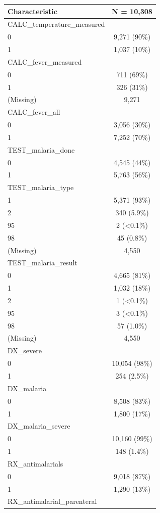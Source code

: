 \documentclass[
  letterpaper,
  DIV=11,
  numbers=noendperiod,
  oneside]{scrreprt}
\begin{document}
\begin{longtable}[]{@{}lc@{}}
\toprule\noalign{}
\textbf{Characteristic} & \textbf{N = 10,308} \\
\midrule\noalign{}
\endhead
\bottomrule\noalign{}
\endlastfoot
CALC\_temperature\_measured & \\
0 & 9,271 (90\%) \\
1 & 1,037 (10\%) \\
CALC\_fever\_measured & \\
0 & 711 (69\%) \\
1 & 326 (31\%) \\
(Missing) & 9,271 \\
CALC\_fever\_all & \\
0 & 3,056 (30\%) \\
1 & 7,252 (70\%) \\
TEST\_malaria\_done & \\
0 & 4,545 (44\%) \\
1 & 5,763 (56\%) \\
TEST\_malaria\_type & \\
1 & 5,371 (93\%) \\
2 & 340 (5.9\%) \\
95 & 2 (\textless0.1\%) \\
98 & 45 (0.8\%) \\
(Missing) & 4,550 \\
TEST\_malaria\_result & \\
0 & 4,665 (81\%) \\
1 & 1,032 (18\%) \\
2 & 1 (\textless0.1\%) \\
95 & 3 (\textless0.1\%) \\
98 & 57 (1.0\%) \\
(Missing) & 4,550 \\
DX\_severe & \\
0 & 10,054 (98\%) \\
1 & 254 (2.5\%) \\
DX\_malaria & \\
0 & 8,508 (83\%) \\
1 & 1,800 (17\%) \\
DX\_malaria\_severe & \\
0 & 10,160 (99\%) \\
1 & 148 (1.4\%) \\
RX\_antimalarials & \\
0 & 9,018 (87\%) \\
1 & 1,290 (13\%) \\
RX\_antimalarial\_parenteral & \\

\end{longtable}
\end{document}
